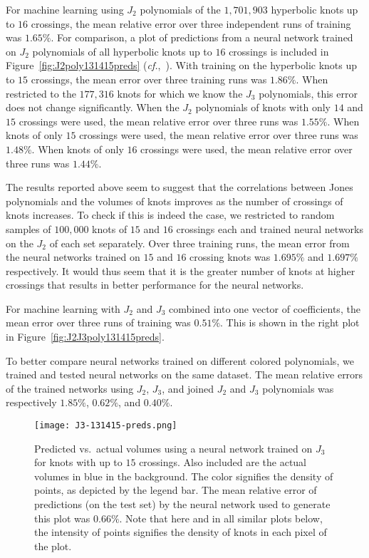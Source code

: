 \documentclass[11pt]{article}
\begin{document}
For machine learning using $J_2$ polynomials of the $1{,} 701{,} 903$ hyperbolic knots up to $16$ crossings, the mean relative error over three independent runs of training was $1.65\%$.
For comparison, a plot of predictions from a neural network trained on $J_2$ polynomials of all hyperbolic knots up to $16$ crossings is included in Figure~\ref{fig:J2poly131415preds} (\textit{cf.},~\cite{Jejjala:2019kio, Craven:2020bdz}).
With training on the hyperbolic knots up to $15$ crossings, the mean error over three training runs was $1.86\%$.
When restricted to the $177{,}316$ knots for which we know the $J_3$ polynomials, this error does not change significantly.
When the $J_2$ polynomials of knots with only $14$ and $15$ crossings were used, the mean relative error over three runs was $1.55\%$.
When knots of only $15$ crossings were used, the mean relative error over three runs was $1.48\%$.
When knots of only $16$ crossings were used, the mean relative error over three runs was $1.44\%$.

The results reported above seem to suggest that the correlations between Jones polynomials and the volumes of knots improves as the number of crossings of knots increases.
To check if this is indeed the case, we restricted to random samples of $100,000$ knots of $15$ and $16$ crossings each and trained neural networks on the $J_2$ of each set separately.
Over three training runs, the mean error from the neural networks trained on $15$ and $16$ crossing knots was $1.695\%$ and $1.697\%$ respectively.
It would thus seem that it is the greater number of knots at higher crossings that results in better performance for the neural networks.

For machine learning with $J_2$ and $J_3$ combined into one vector of coefficients, the mean error over three runs of training was $0.51\%$.
This is shown in the right plot in  Figure~\ref{fig:J2J3poly131415preds}.

To better compare neural networks trained on different colored polynomials, we trained and tested neural networks on the same dataset.
The mean relative errors of the trained networks using $J_2$, $J_3$, and joined $J_2$ and $J_3$ polynomials was respectively $1.85\%$, $0.62\%$, and $0.40\%$.

\begin{figure}[h] 
  \begin{center}
    \texttt{[image: J3-131415-preds.png]}
  \end{center}
  \caption{{\textsf{Predicted vs.\ actual volumes using a neural network trained on $J_3$ for knots with up to $15$ crossings. Also included are the actual volumes in blue in the background. The color signifies the density of points, as depicted by the legend bar. The mean relative error of predictions (on the test set) by the neural network used to generate this plot was $0.66\%$. Note that here and in all similar plots below, the intensity of points signifies the density of knots in each pixel of the plot.}}}  \label{fig:J3poly131415preds}
\end{figure}
\end{document}
